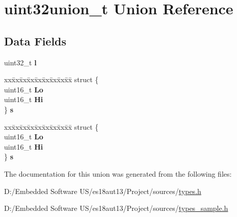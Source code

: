 \hypertarget{unionuint32union__t}{}\section{uint32union\+\_\+t Union Reference}
\label{unionuint32union__t}
\subsection*{Data Fields}
\begin{DoxyCompactItemize}
\item 
\hypertarget{unionuint32union__t_a02b7aaa4708411c52446dc5528f66c25}{}uint32\+\_\+t {\bfseries l}\label{unionuint32union__t_a02b7aaa4708411c52446dc5528f66c25}

\item 
\hypertarget{unionuint32union__t_a9334964883d452264b09a15f99c8f9fe}{}\begin{tabbing}
xx\=xx\=xx\=xx\=xx\=xx\=xx\=xx\=xx\=\kill
struct \{\\
\>uint16\_t {\bfseries Lo}\\
\>uint16\_t {\bfseries Hi}\\
\} {\bfseries s}\label{unionuint32union__t_a9334964883d452264b09a15f99c8f9fe}
\\

\end{tabbing}\item 
\hypertarget{unionuint32union__t_a34b7ec19a1c677c8cf108d7c322bb58e}{}\begin{tabbing}
xx\=xx\=xx\=xx\=xx\=xx\=xx\=xx\=xx\=\kill
struct \{\\
\>uint16\_t {\bfseries Lo}\\
\>uint16\_t {\bfseries Hi}\\
\} {\bfseries s}\label{unionuint32union__t_a34b7ec19a1c677c8cf108d7c322bb58e}
\\

\end{tabbing}\end{DoxyCompactItemize}


The documentation for this union was generated from the following files\+:\begin{DoxyCompactItemize}
\item 
D\+:/\+Embedded Software U\+S/es18aut13/\+Project/sources/\hyperlink{types_8h}{types.\+h}\item 
D\+:/\+Embedded Software U\+S/es18aut13/\+Project/sources/\hyperlink{types__sample_8h}{types\+\_\+sample.\+h}\end{DoxyCompactItemize}
